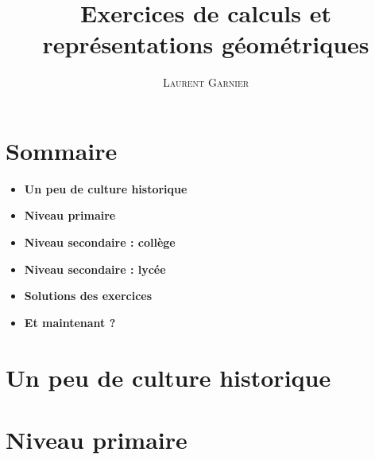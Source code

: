 \documentclass[12pt]{memoir}
\title{Exercices de calculs et représentations géométriques}
\author{\textsc{Laurent Garnier}}
\date{}
\begin{document}
\pagestyle{plain}                        %
\maketitle



\chapter*{Sommaire}
\begin{itemize}
  \item \textbf{Un peu de culture historique}
  \item \textbf{Niveau primaire}
  \item \textbf{Niveau secondaire : collège}
  \item \textbf{Niveau secondaire : lycée}
  \item \textbf{Solutions des exercices}
  \item \textbf{Et maintenant ?}
\end{itemize}
\cleardoublepage



\chapter{Un peu de culture historique}



\chapter{Niveau primaire}


\end{document}
